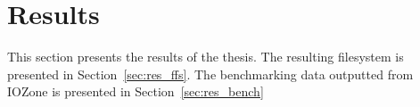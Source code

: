 
\chapter{Results}
\label{ch:results}

This section presents the results of the thesis. The resulting filesystem is presented in Section~\ref{sec:res_ffs}. The benchmarking data outputted from IOZone is presented in Section~\ref{sec:res_bench}


